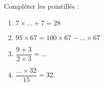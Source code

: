 
\begin{exercice}\label{exosmath-0845}

Compléter les pointillés :
\begin{multicols}{2}
    \begin{enumerate}
        \item
            \( 7\times \ldots +7=28\)
        \item
            \( 95\times 67=100\times 67-\ldots\times 67\)
        \item
            \( \dfrac{ 9+ 3 }{ 2\times 3 }=\ldots\)
        \item
            \( \dfrac{ \ldots\times 32 }{ 15 }=32\).
    \end{enumerate}
\end{multicols}

\end{exercice}
